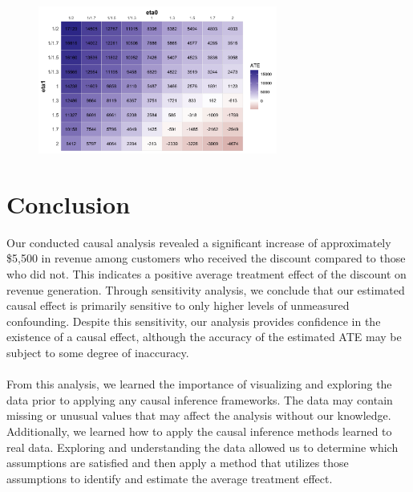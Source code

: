 \documentclass{article}
\begin{document}
\begin{figure}[H]
  \centering
  \includegraphics[width = 0.7\textwidth]{figs/sens_heatmap.png}
\end{figure}

\section{Conclusion}
Our conducted causal analysis revealed a significant increase of approximately \$5,500 in revenue among customers who received the discount compared to those who did not. This indicates a positive average treatment effect of the discount on revenue generation. Through sensitivity analysis, we conclude that our estimated causal effect is primarily sensitive to only higher levels of unmeasured confounding. Despite this sensitivity, our analysis provides confidence in the existence of a causal effect, although the accuracy of the estimated ATE may be subject to some degree of inaccuracy.\\
\\
From this analysis, we learned the importance of visualizing and exploring the data prior to applying any causal inference frameworks. The data may contain missing or unusual values that may affect the analysis without our knowledge. Additionally, we learned how to apply the causal inference methods learned to real data. Exploring and understanding the data allowed us to determine which assumptions are satisfied and then apply a method that utilizes those assumptions to identify and estimate the average treatment effect. 
\end{document}
